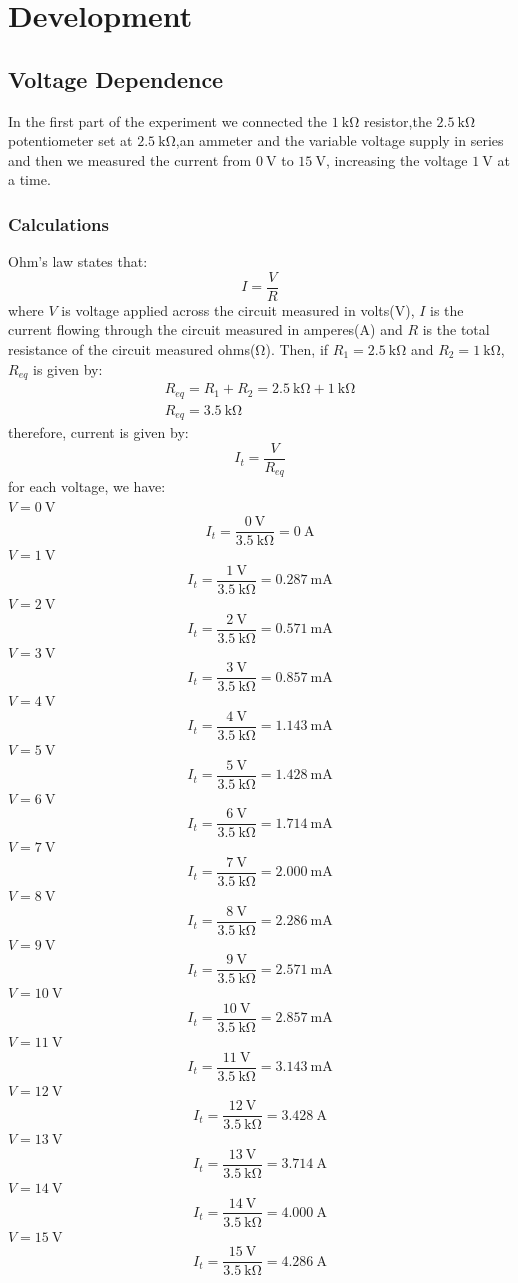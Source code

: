 \documentclass[a4paper]{article}
\begin{document}
\section{Development}
\subsection{Voltage Dependence}
In the first part of the experiment we connected the $\SI{1}{\kilo\ohm}$ resistor,the
$\SI{2.5}{\kilo\ohm}$ potentiometer set at $\SI{2.5}{\kilo\ohm}$,an ammeter and the variable voltage supply in series
and then we measured the current from $\SI{0}{\volt}$ to $\SI{15}{\volt}$, increasing the
voltage $\SI{1}{\volt}$ at a time.
\subsubsection{Calculations}
Ohm's law states that:
\[I=\frac{V}{R}\]
where $V$ is voltage applied across the circuit measured in volts($\si{\volt}$), $I$ is the current flowing
through the circuit measured in amperes($\si{\ampere}$) and $R$ is the total resistance of the
circuit measured ohms($\si{\ohm}$).
Then, if $R_1=\SI{2.5}{\kilo\ohm}$ and $R_2=\SI{1}{\kilo\ohm}$, $R_{eq}$ is given by:
\begin{gather*}
    R_{eq}=R_1+R_2=\SI{2.5}{\kilo\ohm}+\SI{1}{\kilo\ohm}\\
    R_{eq}=\SI{3.5}{\kilo\ohm}
\end{gather*}
therefore, current is given by:
\[I_t=\frac{V}{R_{eq}}\]
for each voltage, we have:\\
$V=\SI{0}{\volt}$
\[I_t=\frac{\SI{0}{\volt}}{\SI{3.5}{\kilo\ohm}}=\SI{0}{\ampere}\]
$V=\SI{1}{\volt}$
\[I_t=\frac{\SI{1}{\volt}}{\SI{3.5}{\kilo\ohm}}=\SI{0.287}{\milli\ampere}\]
$V=\SI{2}{\volt}$
\[I_t=\frac{\SI{2}{\volt}}{\SI{3.5}{\kilo\ohm}}=\SI{0.571}{\milli\ampere}\]
$V=\SI{3}{\volt}$
\[I_t=\frac{\SI{3}{\volt}}{\SI{3.5}{\kilo\ohm}}=\SI{0.857}{\milli\ampere}\]
$V=\SI{4}{\volt}$
\[I_t=\frac{\SI{4}{\volt}}{\SI{3.5}{\kilo\ohm}}=\SI{1.143}{\milli\ampere}\]
$V=\SI{5}{\volt}$
\[I_t=\frac{\SI{5}{\volt}}{\SI{3.5}{\kilo\ohm}}=\SI{1.428}{\milli\ampere}\]
$V=\SI{6}{\volt}$
\[I_t=\frac{\SI{6}{\volt}}{\SI{3.5}{\kilo\ohm}}=\SI{1.714}{\milli\ampere}\]
$V=\SI{7}{\volt}$
\[I_t=\frac{\SI{7}{\volt}}{\SI{3.5}{\kilo\ohm}}=\SI{2.000}{\milli\ampere}\]
$V=\SI{8}{\volt}$
\[I_t=\frac{\SI{8}{\volt}}{\SI{3.5}{\kilo\ohm}}=\SI{2.286}{\milli\ampere}\]
$V=\SI{9}{\volt}$
\[I_t=\frac{\SI{9}{\volt}}{\SI{3.5}{\kilo\ohm}}=\SI{2.571}{\milli\ampere}\]
$V=\SI{10}{\volt}$
\[I_t=\frac{\SI{10}{\volt}}{\SI{3.5}{\kilo\ohm}}=\SI{2.857}{\milli\ampere}\]
$V=\SI{11}{\volt}$
\[I_t=\frac{\SI{11}{\volt}}{\SI{3.5}{\kilo\ohm}}=\SI{3.143}{\milli\ampere}\]
$V=\SI{12}{\volt}$
\[I_t=\frac{\SI{12}{\volt}}{\SI{3.5}{\kilo\ohm}}=\SI{3.428}{\ampere}\]
$V=\SI{13}{\volt}$
\[I_t=\frac{\SI{13}{\volt}}{\SI{3.5}{\kilo\ohm}}=\SI{3.714}{\ampere}\]
$V=\SI{14}{\volt}$
\[I_t=\frac{\SI{14}{\volt}}{\SI{3.5}{\kilo\ohm}}=\SI{4.000}{\ampere}\]
$V=\SI{15}{\volt}$
\[I_t=\frac{\SI{15}{\volt}}{\SI{3.5}{\kilo\ohm}}=\SI{4.286}{\ampere}\]
\end{document}
